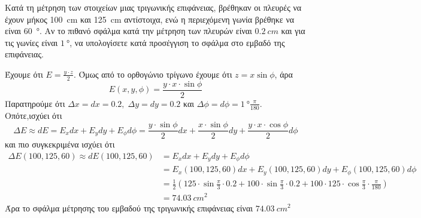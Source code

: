     \begin{example}%
      Κατά τη μέτρηση των στοιχείων μιας τριγωνικής επιφάνειας, βρέθηκαν οι πλευρές να 
      έχουν μήκος \SI{100}{cm} και \SI{125}{cm} αντίστοιχα, ενώ η περιεχόμενη γωνία βρέθηκε 
      να είναι \SI{60}{\degree}. Αν το πιθανό σφάλμα κατά την μέτρηση των πλευρών είναι 
      $ \SI{0.2}{cm} $ και για τις γωνίες είναι $ \SI{1}{\degree} $, να υπολογίσετε κατά 
      προσέγγιση το σφάλμα στο εμβαδό της επιφάνειας.
    \end{example}
    \begin{solution}
      Έχουμε ότι $ E = \frac{y \cdot z}{2} $. Όμως από το ορθογώνιο τρίγωνο έχουμε ότι 
      $ z = x \sin{\phi} $, άρα 
      \[
        E(x,y,\phi) = \frac{y \cdot x \cdot \sin{\phi}}{2} 
      \] 
      Παρατηρούμε ότι $ \Delta x = dx = 0.2, \; \Delta y = dy = 0.2 $ και 
      $ \Delta \phi = d\phi = \SI{1}{\degree} \frac{\pi}{180} $. Οπότε,ισχύει ότι
      \begin{equation*}
        \Delta E \approx dE = E_{x} dx + E_{y} dy + E_{\phi} d\phi = \frac{y \cdot
        \sin{\phi}}{2} dx + \frac{x \cdot \sin{\phi}}{2} dy + 
        \frac{y \cdot x \cdot \cos{\phi}}{2} d\phi
      \end{equation*} 
      και πιο συγκεκριμένα ισχύει ότι 
      \begin{align*}
        \Delta E(100,125,60) \approx dE(100,125,60) 
  &= E_{x} dx + E_{y} dy + E_{\phi} d\phi \\
  &= E_{x}(100,125,60) dx + E_{y}(100,125,60) dy + E_{\phi}(100,125,60) d\phi \\
  &= \frac{1}{2} \left(125 \cdot \sin{\frac{\pi}{3}} \cdot 0.2 + 100 \cdot
    \sin{\frac{\pi}{3}} \cdot 0.2 + 100 \cdot 125 \cdot \cos{\frac{\pi}{3}} \cdot
  \frac{\pi}{180}\right) \\
  &= \SI{74.03}{cm^{2}}
      \end{align*}
      Άρα το σφάλμα μέτρησης του εμβαδού της τριγωνικής επιφάνειας είναι 
      $ \SI{74.03}{cm^{2}} $
    \end{solution}

